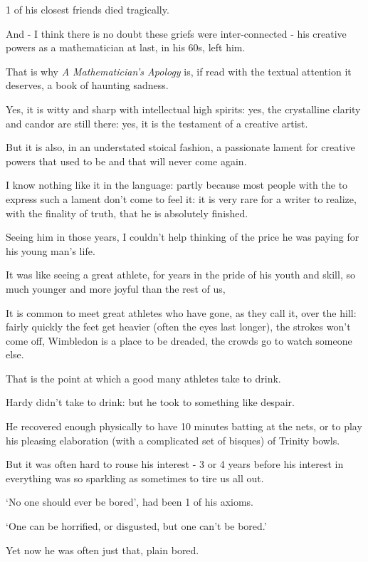 \documentclass{article}
\numberwithin{equation}{section}
\begin{document}
1 of his closest friends died tragically.

And - I think there is no doubt these griefs were inter-connected - his creative powers as a mathematician at last, in his 60s, left him.

%
That is why \textit{A Mathematician's Apology} is, if read with the textual attention it deserves, a book of haunting sadness.

Yes, it is witty and sharp with intellectual high spirits: yes, the crystalline clarity and candor are still there: yes, it is the testament of a creative artist.

But it is also, in an understated stoical fashion, a passionate lament for creative powers that used to be and that will never come again.

I know nothing like it in the language: partly because most people with the  to express such a lament don't come to feel it: it is very rare for a writer to realize, with the finality of truth, that he is absolutely finished.

%
Seeing him in those years, I couldn't help thinking of the price he was paying for his young man's life.

It was like seeing a great athlete, for years in the pride of his youth and skill, so much younger and more joyful than the rest of us, 

It is common to meet great athletes who have gone, as they call it, over the hill: fairly quickly the feet get heavier (often the eyes last longer), the strokes won't come off, Wimbledon is a place to be dreaded, the crowds go to watch someone else.

That is the point at which a good many athletes take to drink.

Hardy didn't take to drink: but he took to something like despair.

He recovered enough physically to have 10 minutes batting at the nets, or to play his pleasing elaboration (with a complicated set of bisques) of Trinity bowls.

But it was often hard to rouse his interest - 3 or 4 years before his interest in everything was so sparkling as sometimes to tire us all out.

`No one should ever be bored', had been 1 of his axioms.

`One can be horrified, or disgusted, but one can't be bored.'

Yet now he was often just that, plain bored.
\end{document}
